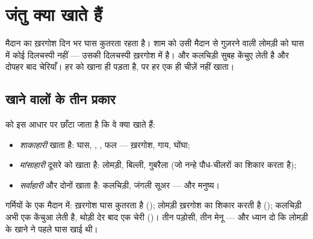\chapter{जंतु क्या खाते हैं}\label{ch:g2:what-animals-eat}

मैदान का ख़रगोश दिन भर घास कुतरता रहता है। शाम को उसी मैदान से गुज़रने
वाली लोमड़ी को घास में कोई दिलचस्पी नहीं --- उसकी दिलचस्पी ख़रगोश में
है। और कलचिड़ी सुबह केंचुए लेती है और दोपहर बाद चेरियाँ। हर  को
खाना ही पड़ता है, पर हर  एक ही चीज़ें नहीं खाता।

\section{खाने वालों के तीन प्रकार}

\begin{definition}[शाकाहारी, मांसाहारी, सर्वाहारी]\label{def:g2:what-animals-eat:kinds}
 को इस आधार पर छाँटा जाता है कि वे क्या खाते हैं:
\begin{itemize}
  \item \emph{शाकाहारी}  खाता है: घास, ,
        , फल --- ख़रगोश, गाय, घोंघा;
  \item \emph{मांसाहारी} दूसरे  को खाता है:
        लोमड़ी, बिल्ली, गुबरैला (जो नन्हे पौध-चीलरों का शिकार करता
        है);
  \item \emph{सर्वाहारी}  और  दोनों खाता है:
        कलचिड़ी, जंगली सूअर --- और मनुष्य।
\end{itemize}
\end{definition}

\begin{example}[एक मैदान, तीन मेनू]\label{ex:g2:what-animals-eat:meadow}
गर्मियों के एक मैदान में: ख़रगोश घास कुतरता है (); लोमड़ी
ख़रगोश का शिकार करती है (); कलचिड़ी अभी एक केंचुआ लेती है,
थोड़ी देर बाद एक चेरी ()। तीन पड़ोसी, तीन मेनू --- और ध्यान
दो कि लोमड़ी के खाने ने पहले घास खाई थी।
\end{example}

